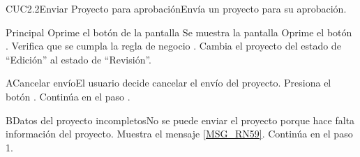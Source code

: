 
\begin{UseCase}{CUC2.2}{Enviar Proyecto para aprobación}{Envía un proyecto para su aprobación.}
\end{UseCase}
	
	
\begin{UCtrayectoria}{Principal}
		\UCpaso[\UCactor] Oprime el botón  de la pantalla 
		\UCpaso Se muestra la pantalla 
		\UCpaso[\UCactor] Oprime el botón . 
		\UCpaso Verifica que se cumpla la regla de negocio . 
		\UCpaso Cambia el proyecto del estado de ``Edición'' al estado de ``Revisión''.
\end{UCtrayectoria}

\begin{UCtrayectoriaA}{A}{Cancelar envío}{El usuario decide cancelar el envío del proyecto.}
			\UCpaso[\UCactor] Presiona el botón .
			\UCpaso Continúa en el paso .
\end{UCtrayectoriaA}

\begin{UCtrayectoriaA}{B}{Datos del proyecto incompletos}{No se puede enviar el proyecto porque hace falta información del proyecto.}
			\UCpaso Muestra el mensaje \ref{MSG_RN59}.
			\UCpaso Continúa en el paso 1.
\end{UCtrayectoriaA}

